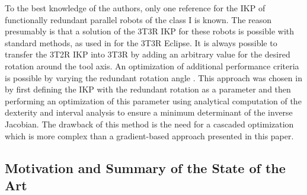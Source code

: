 \documentclass[robotics,article,submit,moreauthors,pdftex]{Definitions/mdpi}
\begin{document}
To the best knowledge of the authors, only one reference \cite{MerletPerDan2000} for the IKP of functionally redundant parallel robots of the class I is known.
The reason presumably is that a solution of the 3T3R IKP for these robots is possible with standard methods, as used in \cite{HongKim2000} for the 3T3R Eclipse.
It is always possible to transfer the 3T2R IKP into 3T3R by adding an arbitrary value for the desired rotation around the tool axis.
An optimization of additional performance criteria is possible by varying the redundant rotation angle \cite{ZhuQuCaoYan2013,GuoDonKe2015}.
This approach was chosen in \cite{MerletPerDan2000} by first defining the IKP with the redundant rotation as a parameter and then performing an optimization of this parameter using analytical computation of the dexterity and interval analysis to ensure a minimum determinant of the inverse Jacobian.
The drawback of this method is the need for a cascaded optimization which is more complex than a gradient-based approach presented in this paper.


\subsection{Motivation and Summary of the State of the Art}
\end{document}
